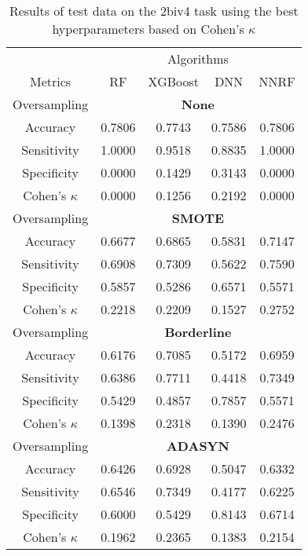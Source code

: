 \begin{table}[!htb]
\centering
\caption{Results of test data on the 2biv4 task using the best hyperparameters based on Cohen's $\kappa$}
\label{tab:2biv4_test_results}
\begin{tabular}{c | c c c c}
\hline
 & \multicolumn{4}{c}{Algorithms}\\ 
Metrics &RF & XGBoost & DNN & NNRF\\ 
\hline
Oversampling &\multicolumn{4}{|c}{\textbf{None}}\\ 
\hline
Accuracy & 0.7806 & 0.7743 & 0.7586 & 0.7806\\ 
Sensitivity & 1.0000 & 0.9518 & 0.8835 & 1.0000\\ 
Specificity & 0.0000 & 0.1429 & 0.3143 & 0.0000\\ 
Cohen's $\kappa$ & 0.0000 & 0.1256 & 0.2192 & 0.0000\\ 
\hline
Oversampling &\multicolumn{4}{|c}{\textbf{SMOTE}}\\ 
\hline
Accuracy & 0.6677 & 0.6865 & 0.5831 & 0.7147\\ 
Sensitivity & 0.6908 & 0.7309 & 0.5622 & 0.7590\\ 
Specificity & 0.5857 & 0.5286 & 0.6571 & 0.5571\\ 
Cohen's $\kappa$ & 0.2218 & 0.2209 & 0.1527 & 0.2752\\ 
\hline
Oversampling &\multicolumn{4}{|c}{\textbf{Borderline}}\\ 
\hline
Accuracy & 0.6176 & 0.7085 & 0.5172 & 0.6959\\ 
Sensitivity & 0.6386 & 0.7711 & 0.4418 & 0.7349\\ 
Specificity & 0.5429 & 0.4857 & 0.7857 & 0.5571\\ 
Cohen's $\kappa$ & 0.1398 & 0.2318 & 0.1390 & 0.2476\\ 
\hline
Oversampling &\multicolumn{4}{|c}{\textbf{ADASYN}}\\ 
\hline
Accuracy & 0.6426 & 0.6928 & 0.5047 & 0.6332\\ 
Sensitivity & 0.6546 & 0.7349 & 0.4177 & 0.6225\\ 
Specificity & 0.6000 & 0.5429 & 0.8143 & 0.6714\\ 
Cohen's $\kappa$ & 0.1962 & 0.2365 & 0.1383 & 0.2154\\ 
\hline
\end{tabular}
\end{table}

